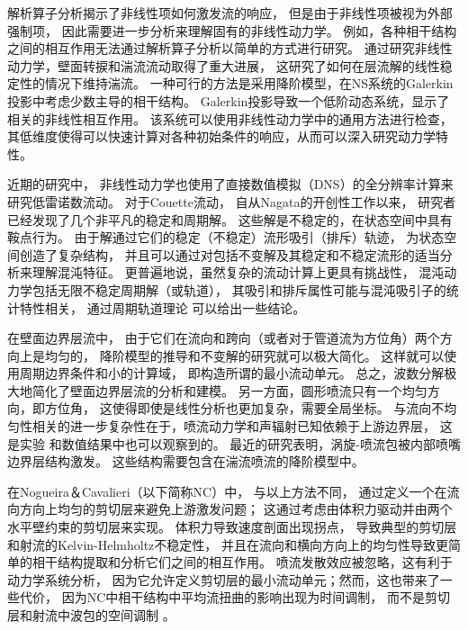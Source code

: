 \documentclass[UTF8,zihao=5]{ctexart} %
\begin{document}
解析算子分析揭示了非线性项如何激发流的响应，
但是由于非线性项被视为外部强制项，
因此需要进一步分析来理解固有的非线性动力学。
例如，各种相干结构之间的相互作用无法通过解析算子分析以简单的方式进行研究。
通过研究非线性动力学，壁面转捩和湍流流动取得了重大进展，
这研究了如何在层流解的线性稳定性的情况下维持湍流。
一种可行的方法是采用降阶模型，在NS系统的Galerkin投影中考虑少数主导的相干结构。
Galerkin投影导致一个低阶动态系统，显示了相关的非线性相互作用。
该系统可以使用非线性动力学中的通用方法进行检查，
其低维度使得可以快速计算对各种初始条件的响应，从而可以深入研究动力学特性。

近期的研究中，
非线性动力学也使用了直接数值模拟（DNS）的全分辨率计算来研究低雷诺数流动。
对于Couette流动，
自从Nagata\cite{nagata1990three}的开创性工作以来，
研究者已经发现了几个非平凡的稳定和周期解。
这些解是不稳定的，在状态空间中具有鞍点行为。
由于解通过它们的稳定（不稳定）流形吸引（排斥）轨迹，
为状态空间创造了复杂结构，
并且可以通过对包括不变解及其稳定和不稳定流形的适当分析来理解混沌特征\cite{gibson2008visualizing}。
更普遍地说，虽然复杂的流动计算上更具有挑战性，
混沌动力学包括无限不稳定周期解（或轨道），
其吸引和排斥属性可能与混沌吸引子的统计特性相关，
通过周期轨道理论\cite{cvitanovic1989periodic,chandler2013invariant}
可以给出一些结论。

在壁面边界层流中，
由于它们在流向和跨向（或者对于管道流为方位角）两个方向上是均匀的，
降阶模型的推导和不变解的研究就可以极大简化。
这样就可以使用周期边界条件和小的计算域，
即构造所谓的最小流动单元。
总之，波数分解极大地简化了壁面边界层流的分析和建模。
另一方面，圆形喷流只有一个均匀方向，即方位角，
这使得即使是线性分析也更加复杂，需要全局坐标。
与流向不均匀性相关的进一步复杂性在于，喷流动力学和声辐射已知依赖于上游边界层，
这是实验\cite{bridges1987roles}
和数值结果\cite{bogey2010influence}中也可以观察到的。
最近的研究表明，涡旋-喷流包被内部喷嘴边界层结构激发。
这些结构需要包含在湍流喷流的降阶模型中。

在Nogueira＆Cavalieri\cite{nogueira2021dynamics}（以下简称NC）中，
与以上方法不同，
通过定义一个在流向方向上均匀的剪切层来避免上游激发问题；
这通过考虑由体积力驱动并由两个水平壁约束的剪切层来实现。
体积力导致速度剖面出现拐点，
导致典型的剪切层和射流的Kelvin-Helmholtz不稳定性，
并且在流向和横向方向上的均匀性导致更简单的相干结构提取和分析它们之间的相互作用。
喷流发散效应被忽略，这有利于动力学系统分析，
因为它允许定义剪切层的最小流动单元；然而，这也带来了一些代价，
因为NC中相干结构中平均流扭曲的影响出现为时间调制，
而不是剪切层和射流中波包的空间调制
\cite{cavalieri2013wavepackets}。
\end{document}
